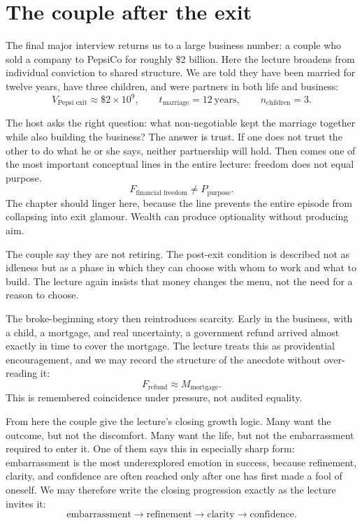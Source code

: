 \section{The couple after the exit}

The final major interview returns us to a large business number: a couple who sold a company to PepsiCo for roughly \$2 billion. Here the lecture broadens from individual conviction to shared structure. We are told they have been married for twelve years, have three children, and were partners in both life and business:
\begin{equation}
V_{\text{Pepsi exit}} \approx \$2\times 10^9, \qquad
t_{\text{marriage}} = 12\ \text{years}, \qquad
n_{\text{children}} = 3.
\end{equation}

The host asks the right question: what non-negotiable kept the marriage together while also building the business? The answer is trust. If one does not trust the other to do what he or she says, neither partnership will hold. Then comes one of the most important conceptual lines in the entire lecture: freedom does not equal purpose.
\begin{equation}
F_{\text{financial freedom}} \neq P_{\text{purpose}}.
\end{equation}
The chapter should linger here, because the line prevents the entire episode from collapsing into exit glamour. Wealth can produce optionality without producing aim.

The couple say they are not retiring. The post-exit condition is described not as idleness but as a phase in which they can choose with whom to work and what to build. The lecture again insists that money changes the menu, not the need for a reason to choose.

The broke-beginning story then reintroduces scarcity. Early in the business, with a child, a mortgage, and real uncertainty, a government refund arrived almost exactly in time to cover the mortgage. The lecture treats this as providential encouragement, and we may record the structure of the anecdote without over-reading it:
\begin{equation}
F_{\text{refund}} \approx M_{\text{mortgage}}.
\end{equation}
This is remembered coincidence under pressure, not audited equality.

From here the couple give the lecture's closing growth logic. Many want the outcome, but not the discomfort. Many want the life, but not the embarrassment required to enter it. One of them says this in especially sharp form: embarrassment is the most underexplored emotion in success, because refinement, clarity, and confidence are often reached only after one has first made a fool of oneself. We may therefore write the closing progression exactly as the lecture invites it:
\begin{equation}
\text{embarrassment} \longrightarrow \text{refinement} \longrightarrow \text{clarity} \longrightarrow \text{confidence}.
\end{equation}

